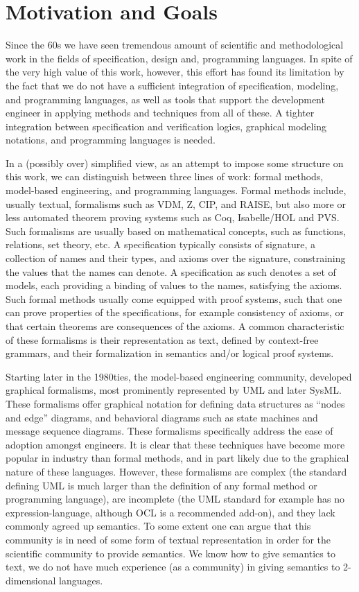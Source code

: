 
\section{Motivation and Goals}
\label{sec:introduction}

Since the 60s we have seen tremendous amount of scientific and 
methodological work in the fields of specification, design and, 
programming languages. In spite of the very high value of this work, however, this effort has found its limitation by the fact that we do not have a sufficient integration of specification, modeling, and programming languages, as well as tools that support the development engineer in applying methods and techniques from all of these. A tighter integration between specification and verification logics, graphical modeling notations, and programming languages is needed.

In a (possibly over) simplified view, as an attempt to impose some 
structure on this work, we can distinguish between three lines of 
work: formal methods, model-based engineering, and 
programming languages. Formal methods include, usually textual, 
formalisms such as VDM, Z, CIP, and RAISE, but also more or less 
automated theorem proving systems such as Coq, Isabelle/HOL and 
PVS. Such formalisms are usually based on mathematical 
concepts, such as functions, relations, set theory, etc. A 
specification typically 
consists of signature, a collection of names and their types, and 
axioms over  the signature, constraining the values that 
the names can denote. A specification as such denotes a set of 
models, each providing a binding of values to the names, satisfying 
the axioms. Such formal methods usually come equipped with proof 
systems, such that one can prove properties of the specifications, 
for example consistency of axioms, or that certain theorems are 
consequences of the axioms. A common characteristic of 
these formalisms is their representation as text, defined by context-free grammars, and their formalization in semantics and/or logical proof systems.

Starting later in the 1980ties, the model-based 
engineering community, developed graphical formalisms, most 
prominently represented by UML and later SysML. These formalisms 
offer graphical notation for defining data structures as ``nodes 
and edge'' diagrams, and behavioral diagrams such as state machines 
and message sequence diagrams. These formalisms specifically 
address the ease of adoption amongst engineers. It is clear that
these techniques have become more popular in industry than formal 
methods, and in part likely due to the graphical nature of 
these languages. However, these formalisms are complex (the 
standard defining UML is much larger than the definition of any 
formal method or programming language), are incomplete (the UML
standard for example has no expression-language, although OCL is
a recommended add-on), and they lack commonly agreed up semantics. 
To some extent one can argue that this community is in need of some form of 
textual representation in order for the scientific community to 
provide semantics. We know how to give semantics to text, we do not 
have much experience (as a community) in giving semantics to 2-
dimensional languages.

